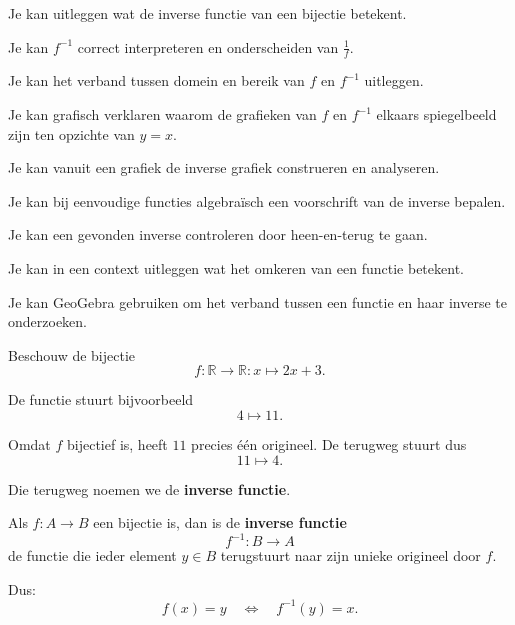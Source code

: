 \documentclass{ximera}
\begin{document}
\begin{leerdoelen}
    \item Je kan uitleggen wat de inverse functie van een bijectie betekent.
    \item Je kan \(f^{-1}\) correct interpreteren en onderscheiden van \(\frac1f\).
    \item Je kan het verband tussen domein en bereik van \(f\) en \(f^{-1}\) uitleggen.
    \item Je kan grafisch verklaren waarom de grafieken van \(f\) en \(f^{-1}\)
          elkaars spiegelbeeld zijn ten opzichte van \(y=x\).
    \item Je kan vanuit een grafiek de inverse grafiek construeren en analyseren.
    \item Je kan bij eenvoudige functies algebraïsch een voorschrift van de inverse bepalen.
    \item Je kan een gevonden inverse controleren door heen-en-terug te gaan.
    \item Je kan in een context uitleggen wat het omkeren van een functie betekent.
    \item Je kan GeoGebra gebruiken om het verband tussen een functie en haar inverse te onderzoeken.
\end{leerdoelen}





Beschouw de bijectie
\[
f:\mathbb R\to\mathbb R:x\mapsto 2x+3.
\]

De functie stuurt bijvoorbeeld
\[
4\longmapsto 11.
\]

Omdat \(f\) bijectief is, heeft \(11\) precies één origineel.
De terugweg stuurt dus
\[
11\longmapsto4.
\]

Die terugweg noemen we de \textbf{inverse functie}.

\begin{definitie}
Als \(f:A\to B\) een bijectie is, dan is de \textbf{inverse functie}
\[
f^{-1}:B\to A
\]
de functie die ieder element \(y\in B\) terugstuurt naar zijn unieke origineel
door \(f\).

Dus:
\[
f(x)=y
\quad\Longleftrightarrow\quad
f^{-1}(y)=x.
\]
\end{definitie}

\begin{center}
\end{center}
\end{document}
